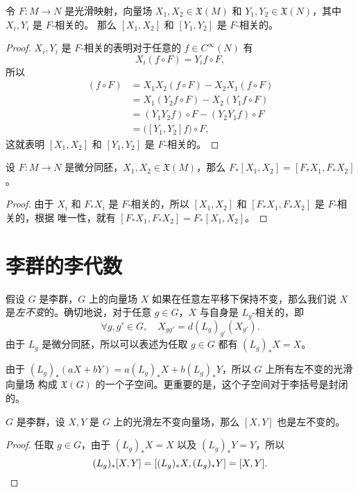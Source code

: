 \begin{proposition}[李括号的自然属性]
  令 $F:M\to N$ 是光滑映射，向量场 $X_1,X_2\in \mathfrak{X}(M)$
  和 $Y_1,Y_2\in \mathfrak{X}(N)$，其中 $X_i,Y_i$ 是 $F$-相关的。
  那么 $[X_1,X_2]$ 和 $[Y_1,Y_2]$ 是 $F$-相关的。
\end{proposition}
\begin{proof}
  $X_i,Y_i$ 是 $F$-相关的表明对于任意的 $f\in C^\infty(N)$ 有
  \[
    X_i(f\circ F)=Y_if\circ F,  
  \] 
  所以
  \begin{align*}
    [X_1,X_2](f\circ F)&=X_1X_2(f\circ F)-X_2X_1(f\circ F)\\
    &=X_1(Y_2f\circ F)-X_2(Y_1f\circ F)\\
    &=(Y_1Y_2f)\circ F-(Y_2Y_1f)\circ F \\
    &=\bigl([Y_1,Y_2]f\bigr)\circ F,
  \end{align*}
  这就表明 $[X_1,X_2]$ 和 $[Y_1,Y_2]$ 是 $F$-相关的。
\end{proof}

\begin{corollary}[李括号的推前]
  设 $F:M\to N$ 是微分同胚，$X_1,X_2\in \mathfrak{X}(M)$，那么
  $F_*[X_1,X_2]=[F_*X_1,F_*X_2]$。
\end{corollary}
\begin{proof}
  由于 $X_i$ 和 $F_*X_i$ 是 $F$-相关的，所以
  $[X_1,X_2]$ 和 $[F_*X_1,F_*X_2]$ 是 $F$-相关的，根据
  唯一性，就有 $[F_*X_1,F_*X_2]=F_*[X_1,X_2]$。
\end{proof}

\section{李群的李代数}

假设 $G$ 是李群，$G$ 上的向量场 $X$ 如果在任意左平移下保持不变，那么我们说
$X$ 是\emph{左不变}的。确切地说，对于任意 $g\in G$，$X$ 与自身是
$L_g$-相关的，即
\[
  \forall g,g'\in G,\quad X_{gg'}=d(L_g)_{g'}(X_{g'}).  
\]
由于 $L_g$ 是微分同胚，所以可以表述为任取 $g\in G$ 都有
$(L_g)_*X=X$。

由于 $(L_g)_*(aX+bY)=a(L_g)_*X+b(L_g)_*Y$，所以 $G$ 上所有左不变的光滑向量场
构成 $\mathfrak{X}(G)$ 的一个子空间。更重要的是，这个子空间对于李括号是封闭的。

\begin{proposition}
  $G$ 是李群，设 $X,Y$ 是 $G$ 上的光滑左不变向量场，那么 $[X,Y]$
  也是左不变的。
\end{proposition}
\begin{proof}
  任取 $g\in G$，由于 $(L_g)_*X=X$ 以及 $(L_g)_*Y=Y$，所以 
  \[
    (L_g)_*[X,Y]=[(L_g)_*X,(L_g)_*Y]=[X,Y].\qedhere
  \]
\end{proof}

